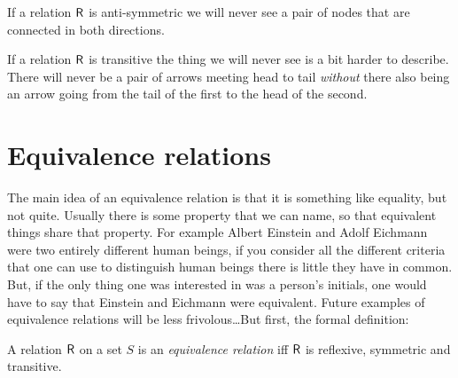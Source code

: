 \begin{center}

\end{center}

\vfill

\newpage

If a relation $\mbox{\textsf R}$ is anti-symmetric we will never see a pair of nodes that are connected in both
directions.

\begin{center}

\end{center}

\vfill

If a relation $\mbox{\textsf R}$ is transitive the thing we will never see is a bit harder to describe.
There will never be a pair of arrows meeting head to tail \emph{without} there also being an
arrow going from the tail of the first to the head of the second. 

\begin{center}

\end{center}

\vfill

\newpage




\newpage

\section{Equivalence relations}
\label{sec:eq_rel}

The main idea of an equivalence relation is that it is something like
equality, but not quite.  Usually there is some property that 
we can name, so that equivalent things share that property.  For 
example Albert Einstein and Adolf Eichmann were two entirely
different human beings, if you consider all the different criteria
that one can use to distinguish human beings there is little they
have in common.  But, if the only thing one was interested in was
a person's initials, one would have to say that Einstein and Eichmann
were equivalent.  Future examples of equivalence relations will
be less frivolous\ldots  But first, the formal definition:

\begin{defi} A relation $\mbox{\textsf R}$ on a set $S$ is an \emph{equivalence relation}
iff $\mbox{\textsf R}$ is reflexive, symmetric and transitive.
\end{defi}

